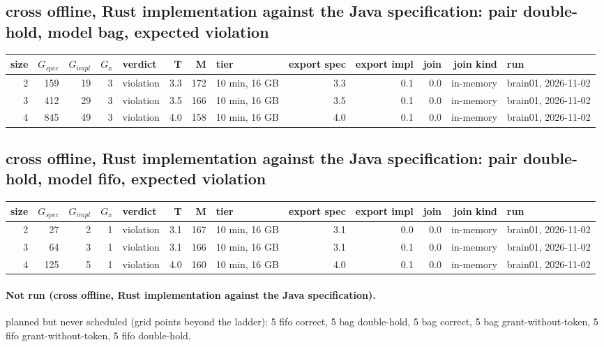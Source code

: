 \documentclass[10pt]{article}
\begin{document}
\subsection*{cross offline, Rust implementation against the Java specification: pair \textsf{double-hold}, model bag, expected violation}
\begin{longtable}{@{}rrrrlrrlrrrrl@{}}
\toprule
size & $G_{\mathit{spec}}$ & $G_{\mathit{impl}}$ & $G_x$ & verdict & T & M & tier & export spec & export impl & join & join kind & run \\
\midrule
\endhead
\color{red} 2 & 159 & 19 & 3 & violation & 3.3 & 172 & 10 min, 16 GB & 3.3 & 0.1 & 0.0 & in-memory & brain01, 2026-11-02 \\
\color{red} 3 & 412 & 29 & 3 & violation & 3.5 & 166 & 10 min, 16 GB & 3.5 & 0.1 & 0.0 & in-memory & brain01, 2026-11-02 \\
\color{red} 4 & 845 & 49 & 3 & violation & 4.0 & 158 & 10 min, 16 GB & 4.0 & 0.1 & 0.0 & in-memory & brain01, 2026-11-02 \\
\bottomrule
\end{longtable}
\subsection*{cross offline, Rust implementation against the Java specification: pair \textsf{double-hold}, model fifo, expected violation}
\begin{longtable}{@{}rrrrlrrlrrrrl@{}}
\toprule
size & $G_{\mathit{spec}}$ & $G_{\mathit{impl}}$ & $G_x$ & verdict & T & M & tier & export spec & export impl & join & join kind & run \\
\midrule
\endhead
\color{red} 2 & 27 & 2 & 1 & violation & 3.1 & 167 & 10 min, 16 GB & 3.1 & 0.0 & 0.0 & in-memory & brain01, 2026-11-02 \\
\color{red} 3 & 64 & 3 & 1 & violation & 3.1 & 166 & 10 min, 16 GB & 3.1 & 0.1 & 0.0 & in-memory & brain01, 2026-11-02 \\
\color{red} 4 & 125 & 5 & 1 & violation & 4.0 & 160 & 10 min, 16 GB & 4.0 & 0.1 & 0.0 & in-memory & brain01, 2026-11-02 \\
\bottomrule
\end{longtable}
\paragraph{Not run (cross offline, Rust implementation against the Java specification).}
planned but never scheduled (grid points beyond the ladder): 5 fifo correct, 5 bag double-hold, 5 bag correct, 5 bag grant-without-token, 5 fifo grant-without-token, 5 fifo double-hold.\par
\end{document}
